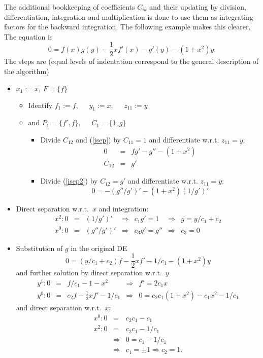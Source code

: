 The additional bookkeeping of coefficients $C_{ik}$ and their updating by
division, differentiation, integration and multiplication is done to use
them as integrating factors for the backward integration.
The following example makes this clearer. The equation is
\begin{equation}
0 = f(x) g(y) - \frac{1}{2}xf'(x) - g'(y) - (1+x^2)y. \label{isep}
\end{equation}
The steps are (equal levels of indentation correspond to the general
description of the algorithm)
\begin{itemize}
 \item $x_1:=x, \, F=\{f\}$
 \begin{itemize}
  \item Identify $f_1:=f, \; \; \; \; \; y_1:=x, \; \; \; \; \; z_{11}:=y$
  \item and $P_1=\{f',f\}, \; \; \; \; \; C_1=\{1,g\}$
  \begin{itemize}
   \item Divide $C_{12}$ and
         (\ref{isep}) by $C_{11}=1$ and differentiate w.r.t. $z_{11}=y:$
         \begin{eqnarray}
         0 & = & fg' - g'' - (1+x^2)   \label{isep2}  \\
         C_{12} & = & g'    \nonumber
         \end{eqnarray}
 \item Divide (\ref{isep2}) by $C_{12}=g'$ and differentiate w.r.t. $z_{11}=y:$
\[ 0 = - (g''/g')' - (1+x^2)(1/g')' \]

  \end{itemize}
 \end{itemize}
 \item Direct separation w.r.t.\ $x$ and integration:
 \[\begin{array}{rclclcl}
  x^2: 0 & = & (1/g')' & \Rightarrow & c_1g' =  1 & \Rightarrow &
        g = y/c_1 + c_2 \\
  x^0: 0 & = & (g''/g')' & \Rightarrow & c_3g' = g'' & \Rightarrow &
        c_3 = 0
 \end{array} \]
 \item Substitution of $g$ in the original DE
       \[0 = (y/c_1+c_2)f - \frac{1}{2}xf' - 1/c_1 - (1+x^2)y \]
       and further solution by direct separation w.r.t.\ $y$
 \[\begin{array}{rclcl}
  y^1: 0 & = & f/c_1 - 1 - x^2               & \Rightarrow & f'  =  2c_1x \\
  y^0: 0 & = & c_2f - \frac{1}{2}xf' - 1/c_1 & \Rightarrow & 0   =
       c_2c_1(1+x^2) - c_1x^2 - 1/c_1
 \end{array}\]
       and direct separation w.r.t.\ $x$:
 \begin{eqnarray*}
 x^0:  0 & = & c_2c_1 - c_1    \\
 x^2:  0 & = & c_2c_1 - 1/c_1   \\
    & \Rightarrow &  0 = c_1 - 1/c_1   \\
    & \Rightarrow & c_1 = \pm 1 \Rightarrow c_2 = 1.
 \end{eqnarray*}
\end{itemize}
